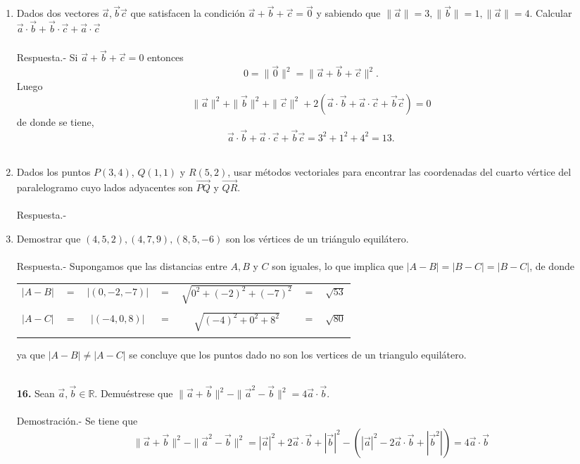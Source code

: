 \begin{enumerate}
\item Dados dos vectores $\vec{a},\vec{b}\vec{c}$ que satisfacen la condición $\vec{a}+\vec{b}+\vec{c} = \vec{0}$ y sabiendo que $\|\vec{a}\|=3, \|\vec{b}\|=1,\|\vec{a}\|=4$. Calcular $\vec{a}\cdot \vec{b}+\vec{b}\cdot \vec{c}+\vec{a}\cdot \vec{c}$\\\\
    Respuesta.-\; Si $\vec{a}+\vec{b}+\vec{c}=0$ entonces $$0=\|\vec{0}\|^2=\|\vec{a}+\vec{b}+\vec{c}\|^2.$$ Luego $$\|\vec{a}\|^2 + \|\vec{b}\|^2 + \|\vec{c}\|^2 + 2(\vec{a}\cdot \vec{b} + \vec{a}\cdot \vec{c} + \vec{b}\vec{c}) = 0$$
    de donde se tiene, $$ \vec{a}\cdot \vec{b} + \vec{a}\cdot \vec{c} + \vec{b}\vec{c} = 3^2 + 1^2 + 4^2 = 13.$$\\

\item Dados los puntos $P(3,4)$, $Q(1,1)$ y $R(5,2)$, usar métodos vectoriales para encontrar las coordenadas del cuarto vértice del paralelogramo cuyo lados adyacentes son $\vec{PQ}$ y $\vec{QR}$.\\\\
    Respuesta.-\; 

\item Demostrar que $(4,5,2),(4,7,9),(8,5,-6)$ son los vértices de un triángulo equilátero.\\\\
    Respuesta.-\; Supongamos que las distancias entre $A,B$ y $C$ son iguales, lo que implica que $|A-B|=|B-C|=|B-C|$, de donde 
    \begin{center}
	\begin{tabular}{ccccccc} 
	    $|A-B|$ & $=$ & $|(0,-2,-7)|$ & $=$ & $\sqrt{0^2+(-2)^2 + (-7)^2}$ & $=$ &$\sqrt{53}$\\\\
	    $|A-C|$ & $=$ & $|(-4,0,8)|$ & $=$ & $\sqrt{(-4)^2+0^2+8^2}$ & $=$ & $\sqrt{80}$\\\\  
	\end{tabular}
    \end{center}
    ya que $|A-B|\neq |A-C|$ se concluye que los puntos dado no son los vertices de un triangulo equilátero.\\\\ 


\item [\Large\bfseries 16.] Sean $\vec{a},\vec{b}\in \mathbb{R}$. Demuéstrese que $\|\vec{a}+\vec{b}\|^2-\|\vec{a}^2-\vec{b}\|^2=4\vec{a}\cdot \vec{b}$.\\\\
    Demostración.-\; Se tiene que $$\|\vec{a}+\vec{b}\|^2-\|\vec{a}^2-\vec{b}\|^2=|\vec{a}|^2 + 2\vec{a}\cdot \vec{b} + | \vec{b} |^2 - \left(|\vec{a}|^2 - 2\vec{a} \cdot \vec{b} + |\vec{b}^2|\right)=4\vec{a} \cdot \vec{b}$$\\


\end{enumerate}
